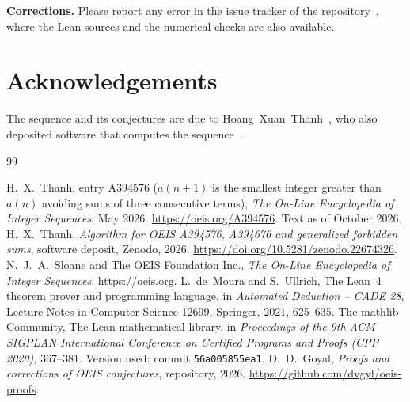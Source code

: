 \documentclass[11pt,a4paper]{article}
\theoremstyle{definition}
\theoremstyle{remark}
\newcommand{\para}[1]{\par\medskip\noindent\textbf{#1}\enspace}
\begin{document}
\para{Corrections.} Please report any error in the issue tracker of the repository~\cite{repo}, where the Lean sources and the numerical checks are also
available.

\section*{Acknowledgements}
The sequence and its conjectures are due to Hoang~Xuan~Thanh~\cite{oeis}, who also deposited software that computes the
sequence~\cite{algorithm}.

\begin{thebibliography}{99}\small
\raggedright
{} H.~X.~Thanh, entry A394576 ($a(n+1)$ is the smallest integer greater than $a(n)$ avoiding sums of three consecutive terms), \emph{The On-Line Encyclopedia of Integer Sequences}, May 2026. \url{https://oeis.org/A394576}. Text as of October 2026.
 H.~X.~Thanh, \emph{Algorithm for OEIS A394576, A394676 and generalized forbidden sums}, software deposit, Zenodo, 2026. \url{https://doi.org/10.5281/zenodo.22674326}.
 N.~J.~A.~Sloane and The OEIS Foundation Inc., \emph{The On-Line Encyclopedia of Integer Sequences}. \url{https://oeis.org}.
 L.~de~Moura and S.~Ullrich, The Lean~4 theorem prover and programming language, in \emph{Automated Deduction -- CADE 28}, Lecture Notes in Computer Science 12699, Springer, 2021, 625--635.
 The mathlib Community, The Lean mathematical library, in \emph{Proceedings of the 9th ACM SIGPLAN International Conference on Certified Programs and Proofs (CPP 2020)}, 367--381. Version used: commit \texttt{56a005855ea1}.
 D.~D.~Goyal, \emph{Proofs and corrections of OEIS conjectures}, repository, 2026. \url{https://github.com/dvgyl/oeis-proofs}.
\end{thebibliography}
\end{document}
